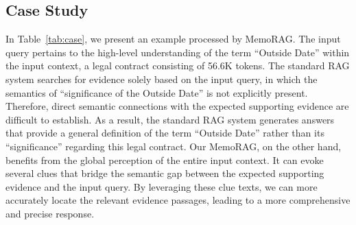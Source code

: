 \documentclass[sigconf]{acmart}
\begin{document}
\subsection{Case Study}
In Table~\ref{tab:case}, we present an example processed by MemoRAG. The input query pertains to the high-level understanding of the term “Outside Date” within the input context, a legal contract consisting of 56.6K tokens. The standard RAG system searches for evidence solely based on the input query, in which the semantics of “significance of the Outside Date” is not explicitly present. Therefore, direct semantic connections with the expected supporting evidence are difficult to establish. As a result, the standard RAG system generates answers that provide a general definition of the term “Outside Date” rather than its “significance” regarding this legal contract.
Our MemoRAG, on the other hand, benefits from the global perception of the entire input context. It can evoke several clues that bridge the semantic gap between the expected supporting evidence and the input query. By leveraging these clue texts, we can more accurately locate the relevant evidence passages, leading to a more comprehensive and precise response.
\end{document}
